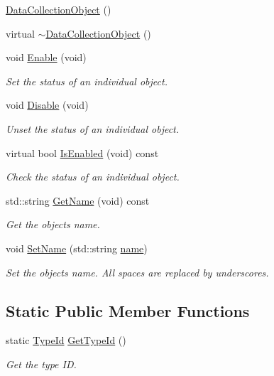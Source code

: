 \begin{DoxyCompactItemize}
\item 
\hyperlink{classns3_1_1DataCollectionObject_a16c95c12486bde9630a2ae81e9c3a590}{Data\+Collection\+Object} ()
\item 
virtual \hyperlink{classns3_1_1DataCollectionObject_ae276bcab516c1e5015bd97a7847c99c7}{$\sim$\+Data\+Collection\+Object} ()
\item 
void \hyperlink{classns3_1_1DataCollectionObject_a2d847cea69f780846614b91d640fedd1}{Enable} (void)
\begin{DoxyCompactList}\small\item\em Set the status of an individual object. \end{DoxyCompactList}\item 
void \hyperlink{classns3_1_1DataCollectionObject_a1e04faf9874b6d65dbb27fa13b034157}{Disable} (void)
\begin{DoxyCompactList}\small\item\em Unset the status of an individual object. \end{DoxyCompactList}\item 
virtual bool \hyperlink{classns3_1_1DataCollectionObject_aec77bad969d0ea340761535a2c58b3c9}{Is\+Enabled} (void) const 
\begin{DoxyCompactList}\small\item\em Check the status of an individual object. \end{DoxyCompactList}\item 
std\+::string \hyperlink{classns3_1_1DataCollectionObject_a2e37eac50a8ff0b7d3030ed82132afdd}{Get\+Name} (void) const 
\begin{DoxyCompactList}\small\item\em Get the object\textquotesingle{}s name. \end{DoxyCompactList}\item 
void \hyperlink{classns3_1_1DataCollectionObject_a9bf5a3af1190f7efadb1baae36889eaa}{Set\+Name} (std\+::string \hyperlink{generate__test__data__lte__spectrum__model_8m_ab74e6bf80237ddc4109968cedc58c151}{name})
\begin{DoxyCompactList}\small\item\em Set the object\textquotesingle{}s name. All spaces are replaced by underscores. \end{DoxyCompactList}\end{DoxyCompactItemize}
\subsection*{Static Public Member Functions}
\begin{DoxyCompactItemize}
\item 
static \hyperlink{classns3_1_1TypeId}{Type\+Id} \hyperlink{classns3_1_1DataCollectionObject_afa871097dedb0a4163741ca8744356ae}{Get\+Type\+Id} ()
\begin{DoxyCompactList}\small\item\em Get the type ID. \end{DoxyCompactList}\end{DoxyCompactItemize}

